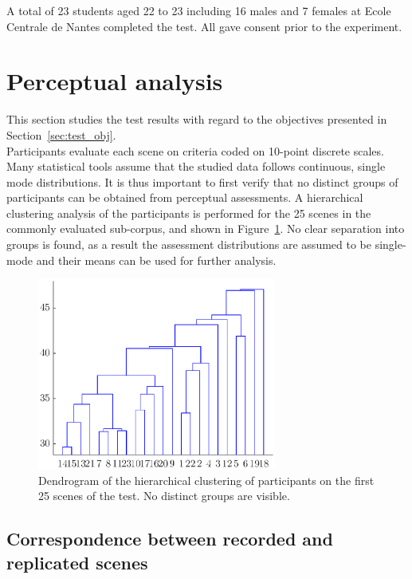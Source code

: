 \documentclass[11pt,a4paper]{article}
\begin{document}
A total of 23 students aged 22 to 23 including 16 males and 7 females at Ecole Centrale de Nantes completed the test. All gave consent prior to the experiment.

\section{Perceptual analysis}
\label{sec:perc}

This section studies the test results with regard to the objectives presented in Section~\ref{sec:test_obj}.\\

Participants evaluate each scene on criteria coded on 10-point discrete scales. Many statistical tools assume that the studied data follows continuous, single mode distributions. It is thus important to first verify that no distinct groups of participants can be obtained from perceptual assessments. A hierarchical clustering analysis of the participants is performed for the 25 scenes in the commonly evaluated sub-corpus, and shown in Figure~\ref{fig:hclusters}. No clear separation into groups is found, as a result the assessment distributions are assumed to be single-mode and their means can be used for further analysis.

\begin{figure}[!h]
    \centering
    \includegraphics[width=0.7\textwidth]{figures/subj_gr.eps}
    \caption{Dendrogram of the hierarchical clustering of participants on the first 25 scenes of the test. No distinct groups are visible.}\label{fig:hclusters}
\end{figure}

\subsection{Correspondence between recorded and replicated scenes}
\label{sec:perc_recrep}
\end{document}
